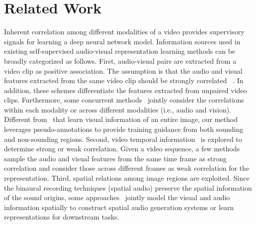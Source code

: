 \section{Related Work}
\vspace{\secmargin}
%
Inherent correlation among different modalities of a video provides supervisory signals for learning a deep neural network model.
%
Information sources used in existing self-supervised audio-visual representation learning methods can be broadly categorized as follows. 
%
First, audio-visual pairs are extracted from a video clip as positive association. 
%
The assumption is that the audio and visual features extracted from the same video clip should be strongly correlated ~\cite{av_iccv17_look,av_eccv18_obj_that_sound,av_nips16_soundnet,av_eccv16_abSound,avt_nips20_VersatileNet,av_nips20_xdc,av_nips20_CrossLabelling,av_iclr21_activeContrastive}. 
%
In addition, these schemes differentiate the features extracted from unpaired video clips.
%
Furthermore, some concurrent methods~\cite{av_cvpr21_agreementAVID,av_cvpr21_RAVID} jointly consider the correlations within each modality or across different modalities (i.e., audio and vision).
%
Different from~\cite{av_cvpr21_agreementAVID,av_cvpr21_RAVID} that learn visual information of an entire image, our method leverages pseudo-annotations to provide training guidance from both sounding and non-sounding regions.
% 
Second, video temporal information~\cite{av_eccv18_Owens,av_nips18_coop} is explored to determine strong or weak correlation. 
%
Given a video sequence, a few methods sample the audio and visual features from the same time frame as strong correlation and consider those across different frames as weak correlation for the representation.
%
Third, spatial relations among image regions are exploited. 
%
Since the binaural recording techniques (spatial audio) preserve the spatial information of the sound origins, some approaches~\cite{25d,av_nips20_spatial_alignment,360gen,av_cvpr20_tell_left_right,av_eccv20_sep-stereo,my_aaai21_avconsistency,av_cvpr21_withoutBinaural,lu2019self} jointly model the visual and audio information spatially to construct spatial audio generation systems or learn representations for downstream tasks.
%

